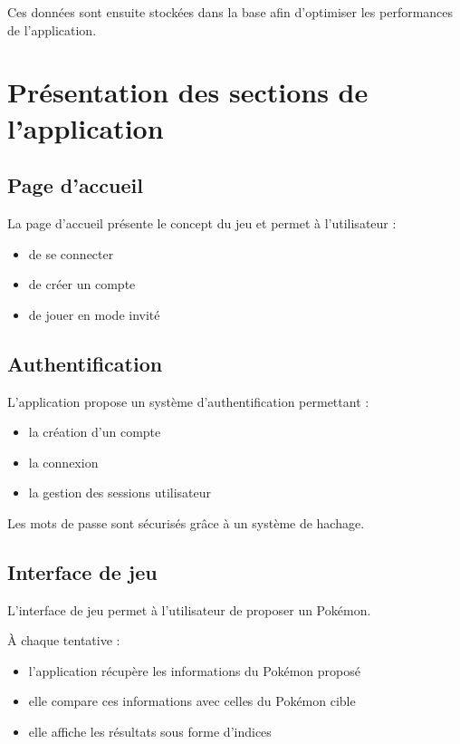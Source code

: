\documentclass[a4paper,12pt]{article}
\begin{document}
    Ces données sont ensuite stockées dans la base afin d’optimiser les performances de l’application.

    \section{Présentation des sections de l'application}

    \subsection{Page d'accueil}

    La page d'accueil présente le concept du jeu et permet à l'utilisateur :

    \begin{itemize}
        \item de se connecter
        \item de créer un compte
        \item de jouer en mode invité
    \end{itemize}

    \subsection{Authentification}

    L'application propose un système d'authentification permettant :

    \begin{itemize}
        \item la création d’un compte
        \item la connexion
        \item la gestion des sessions utilisateur
    \end{itemize}

    Les mots de passe sont sécurisés grâce à un système de hachage.

    \subsection{Interface de jeu}

    L’interface de jeu permet à l’utilisateur de proposer un Pokémon.

    À chaque tentative :

    \begin{itemize}
        \item l'application récupère les informations du Pokémon proposé
        \item elle compare ces informations avec celles du Pokémon cible
        \item elle affiche les résultats sous forme d'indices
    \end{itemize}
\end{document}
